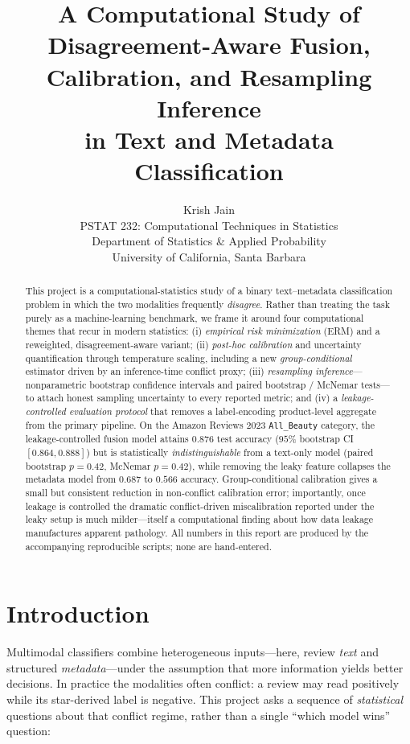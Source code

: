 \documentclass[11pt,a4paper]{article}
\title{A Computational Study of Disagreement-Aware Fusion,\\
Calibration, and Resampling Inference\\
in Text and Metadata Classification}
\author{Krish Jain \\
  PSTAT 232: Computational Techniques in Statistics \\
  Department of Statistics \& Applied Probability \\
  University of California, Santa Barbara}
\date{}
\begin{document}
\maketitle

\begin{abstract}
This project is a computational-statistics study of a binary text--metadata
classification problem in which the two modalities frequently \emph{disagree}.
Rather than treating the task purely as a machine-learning benchmark, we frame
it around four computational themes that recur in modern statistics:
(i) \emph{empirical risk minimization} (ERM) and a reweighted, disagreement-aware
variant; (ii) \emph{post-hoc calibration} and uncertainty quantification through
temperature scaling, including a new \emph{group-conditional} estimator driven by
an inference-time conflict proxy; (iii) \emph{resampling inference}---nonparametric
bootstrap confidence intervals and paired bootstrap / McNemar tests---to attach
honest sampling uncertainty to every reported metric; and (iv) a
\emph{leakage-controlled evaluation protocol} that removes a label-encoding
product-level aggregate from the primary pipeline. On the Amazon Reviews 2023
\texttt{All\_Beauty} category, the leakage-controlled fusion model attains
$0.876$ test accuracy ($95\%$ bootstrap CI $[0.864,0.888]$) but is statistically
\emph{indistinguishable} from a text-only model (paired bootstrap $p=0.42$,
McNemar $p=0.42$), while removing the leaky feature collapses the metadata
model from $0.687$ to $0.566$ accuracy. Group-conditional calibration gives a
small but consistent reduction in non-conflict calibration error; importantly,
once leakage is controlled the dramatic conflict-driven miscalibration reported
under the leaky setup is much milder---itself a computational finding about how
data leakage manufactures apparent pathology. All numbers in this report are
produced by the accompanying reproducible scripts; none are hand-entered.
\end{abstract}

\tableofcontents

\section{Introduction}
\label{sec:intro}

Multimodal classifiers combine heterogeneous inputs---here, review \emph{text}
and structured \emph{metadata}---under the assumption that more information
yields better decisions. In practice the modalities often conflict: a review may
read positively while its star-derived label is negative. This project asks a
sequence of \emph{statistical} questions about that conflict regime, rather than
a single ``which model wins'' question:
\end{document}
